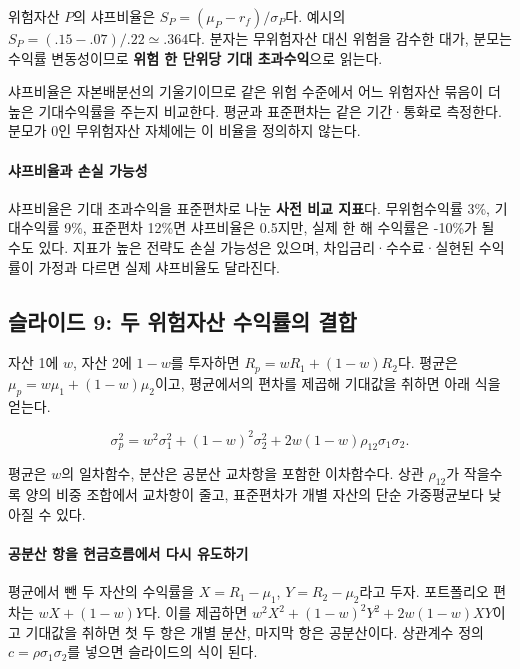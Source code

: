 \documentclass[11pt,a4paper]{article}
\begin{document}
위험자산 $P$의 샤프비율은 $S_P=(\mu_P-r_f)/\sigma_P$다. 예시의 $S_P=(.15-.07)/.22\simeq.364$다. 분자는 무위험자산 대신 위험을 감수한 대가, 분모는 수익률 변동성이므로 \textbf{위험 한 단위당 기대 초과수익}으로 읽는다.
\par

샤프비율은 자본배분선의 기울기이므로 같은 위험 수준에서 어느 위험자산 묶음이 더 높은 기대수익률을 주는지 비교한다. 평균과 표준편차는 같은 기간·통화로 측정한다. 분모가 0인 무위험자산 자체에는 이 비율을 정의하지 않는다.
\par

\paragraph{샤프비율과 손실 가능성}

샤프비율은 기대 초과수익을 표준편차로 나눈 \textbf{사전 비교 지표}다. 무위험수익률 3\%, 기대수익률 9\%, 표준편차 12\%면 샤프비율은 0.5지만, 실제 한 해 수익률은 -10\%가 될 수도 있다. 지표가 높은 전략도 손실 가능성은 있으며, 차입금리·수수료·실현된 수익률이 가정과 다르면 실제 샤프비율도 달라진다.
\par

\subsection{슬라이드 9: 두 위험자산 수익률의 결합}

자산 1에 $w$, 자산 2에 $1-w$를 투자하면 $R_p=wR_1+(1-w)R_2$다. 평균은 $\mu_p=w\mu_1+(1-w)\mu_2$이고, 평균에서의 편차를 제곱해 기대값을 취하면 아래 식을 얻는다.
\par

\[
\sigma_p^2=w^2\sigma_1^2+(1-w)^2\sigma_2^2+2w(1-w)\rho_{12}\sigma_1\sigma_2.
\]

평균은 $w$의 일차함수, 분산은 공분산 교차항을 포함한 이차함수다. 상관 $\rho_{12}$가 작을수록 양의 비중 조합에서 교차항이 줄고, 표준편차가 개별 자산의 단순 가중평균보다 낮아질 수 있다.
\par

\paragraph{공분산 항을 현금흐름에서 다시 유도하기}

평균에서 뺀 두 자산의 수익률을 $X=R_1-\mu_1$, $Y=R_2-\mu_2$라고 두자. 포트폴리오 편차는 $wX+(1-w)Y$다. 이를 제곱하면 $w^2X^2+(1-w)^2Y^2+2w(1-w)XY$이고 기대값을 취하면 첫 두 항은 개별 분산, 마지막 항은 공분산이다. 상관계수 정의 $c=\rho\sigma_1\sigma_2$를 넣으면 슬라이드의 식이 된다.
\par
\end{document}
